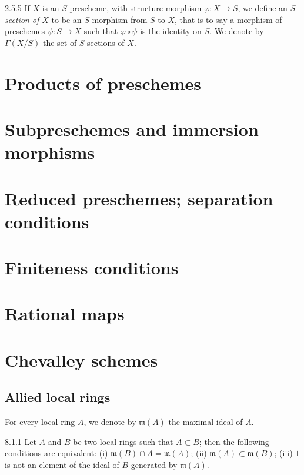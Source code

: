 \documentclass{book}
\begin{document}
\begin{env}{2.5.5}
\label{env-1.2.5.5}
If $X$ is an $S$-prescheme, with structure morphism
$\varphi\colon X\to S$, we define an \emph{$S$-section of $X$} to be an
$S$-morphism from $S$ to $X$, that is to say a morphism of preschemes
$\psi\colon S\to X$ such that $\varphi\circ\psi$ is the identity on $S$.  We
denote by $\Gamma(X/S)$ the set of $S$-sections of $X$.
\end{env}

\section{Products of preschemes}
\label{1-schemes-3}

\section{Subpreschemes and immersion morphisms}
\label{1-schemes-4}

\section{Reduced preschemes; separation conditions}
\label{1-schemes-5}

\section{Finiteness conditions}
\label{1-schemes-6}

\section{Rational maps}
\label{1-schemes-7}

\section{Chevalley schemes}
\label{1-schemes-8}

\subsection{Allied local rings}
\label{1-schemes-8.1}

For every local ring $A$, we denote by $\mathfrak{m}(A)$ the maximal ideal of
$A$.

\begin{envs}[Lemma]{8.1.1}
\label{lem-1.8.1.1}
Let $A$ and $B$ be two local rings such that $A\subset B$;
then the following conditions are equivalent: (i)
$\mathfrak{m}(B)\cap A=\mathfrak{m}(A)$; (ii)
$\mathfrak{m}(A)\subset\mathfrak{m}(B)$; (iii) $1$ is not an element of
the ideal of $B$ generated by $\mathfrak{m}(A)$.
\end{envs}
\end{document}
